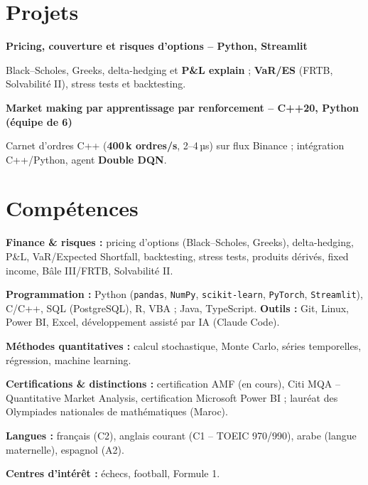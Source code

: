 \documentclass[a4paper,11pt]{article}
\newcommand{\project}[2]{%
  \textbf{#1}\par
  #2\par}
\newcommand{\entrygap}{\par\vspace{3pt}}
\begin{document}
\section{Projets}
\project{Pricing, couverture et risques d'options – Python, Streamlit}
{Black–Scholes, Greeks, delta-hedging et \textbf{P\&L explain} ; \textbf{VaR/ES} (FRTB, Solvabilité II), stress tests et backtesting.}
\entrygap
\project{Market making par apprentissage par renforcement – C++20, Python (équipe de 6)}
{Carnet d'ordres C++ (\textbf{400\,k ordres/s}, 2–4\,µs) sur flux Binance ; intégration C++/Python, agent \textbf{Double DQN}.}

\section{Compétences}
\textbf{Finance \& risques :} pricing d'options (Black–Scholes, Greeks), delta-hedging, P\&L, VaR/Expected Shortfall, backtesting, stress tests, produits dérivés, fixed income, Bâle III/FRTB, Solvabilité II.\par
\textbf{Programmation :} Python (\texttt{pandas}, \texttt{NumPy}, \texttt{scikit-learn}, \texttt{PyTorch}, \texttt{Streamlit}), C/C++, SQL (PostgreSQL), R, VBA ; Java, TypeScript. \textbf{Outils :} Git, Linux, Power BI, Excel, développement assisté par IA (Claude Code).\par
\textbf{Méthodes quantitatives :} calcul stochastique, Monte Carlo, séries temporelles, régression, machine learning.\par
\textbf{Certifications \& distinctions :} certification AMF (en cours), Citi MQA – Quantitative Market Analysis, certification Microsoft Power BI ; lauréat des Olympiades nationales de mathématiques (Maroc).\par
\textbf{Langues :} français (C2), anglais courant (C1 – TOEIC 970/990), arabe (langue maternelle), espagnol (A2).\par
\textbf{Centres d'intérêt :} échecs, football, Formule 1.
\end{document}
